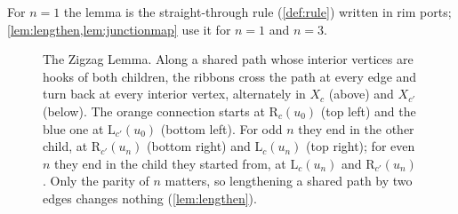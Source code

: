 \documentclass[11pt]{amsart}
\theoremstyle{definition}
\theoremstyle{remark}
\newcommand{\Lp}{\mathrm L}
\newcommand{\Rp}{\mathrm R}
\begin{document}
For $n=1$ the lemma is the straight-through rule (\cref{def:rule}) written in rim ports; \cref{lem:lengthen,lem:junctionmap}
use it for $n=1$ and $n=3$.

\begin{figure}[t]
\centering
\newcommand{\zz}[3]{%
\begin{scope}[xshift=#2cm]
\fill[tilefill] (0,0) rectangle (#1,0.75); \fill[tilefill!65!white] (0,0) rectangle (#1,-0.75);
\draw[thick] (0,0)--(#1,0);
\foreach \k in {0,...,#1} { \fill (\k,0) circle (1.2pt); }
\node[font=\scriptsize] at (0,-0.95) {$u_0$}; \node[font=\scriptsize] at (#1,-0.95) {$u_{#1}$};
\draw[oiorange,line width=1.3pt] (0,0.36) \foreach \k in {1,...,#1} { cos ({\k-0.5},0) sin (\k,{0.36*(-1)^\k}) };
\draw[oiblue,line width=1.3pt] (0,-0.36) \foreach \k in {1,...,#1} { cos ({\k-0.5},0) sin (\k,{-0.36*(-1)^\k}) };
\node[font=\small] at ({#1/2},1.0) {#3};
\end{scope}}
\caption{The Zigzag Lemma. Along a shared path whose interior vertices are hooks of both children, the ribbons cross the
path at every edge and turn back at every interior vertex, alternately in $X_c$ (above) and $X_{c'}$ (below). The orange
connection starts at $\Rp_c(u_0)$ (top left) and the blue one at $\Lp_{c'}(u_0)$ (bottom left). For odd $n$ they end in
the other child, at $\Rp_{c'}(u_n)$ (bottom right) and $\Lp_c(u_n)$ (top right); for even $n$ they end in the child they
started from, at $\Lp_c(u_n)$ and $\Rp_{c'}(u_n)$. Only the parity of $n$ matters, so lengthening a shared path by two
edges changes nothing (\cref{lem:lengthen}).}
\label{fig:zigzag}
\end{figure}
\end{document}
